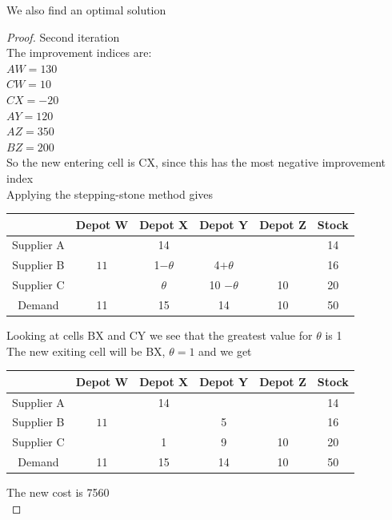 \documentclass[a4paper]{article}
\begin{document}
\begin{eg}
	We also find an optimal solution\\
	\begin{proof}
		Second iteration\\
		The improvement indices are:\\
		$AW=130$\\
		$CW=10$\\
		$CX=-20$\\
		$AY=120$\\
		$AZ=350$\\
		$BZ=200$\\

		So the new entering cell is CX, since this has the most negative improvement index \\

		Applying the stepping-stone method gives
		\begin{center}
			\begin{tabular}{|c|c|c|c|c|c|}
				\hline
				           & Depot W & Depot X    & Depot Y       & Depot Z & Stock \\
				\hline
				Supplier A &         & 14         &               &         & 14    \\
				\hline
				Supplier B & $11$    & 1$-\theta$ & 4$+\theta$    &         & 16    \\
				\hline
				Supplier C &         & $\theta$   & 10  $-\theta$ & 10      & 20    \\
				\hline
				Demand     & 11      & 15         & 14            & 10      & 50    \\
				\hline
			\end{tabular}
		\end{center}
		Looking at cells BX and CY we see that the greatest value for $\theta$ is 1\\

		The new exiting cell will be BX, $\theta=1$ and we get
		\begin{center}
			\begin{tabular}{|c|c|c|c|c|c|}
				\hline
				           & Depot W & Depot X & Depot Y & Depot Z & Stock \\
				\hline
				Supplier A &         & 14      &         &         & 14    \\
				\hline
				Supplier B & $11$    &         & 5       &         & 16    \\
				\hline
				Supplier C &         & 1       & 9       & 10      & 20    \\
				\hline
				Demand     & 11      & 15      & 14      & 10      & 50    \\
				\hline
			\end{tabular}
		\end{center}
		The new cost is 7560\\


\end{proof}
\end{eg}
\end{document}
